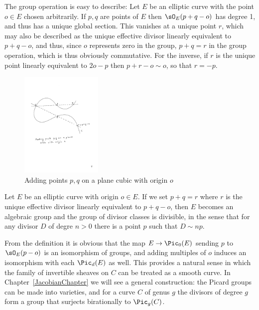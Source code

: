 The group operation is easy to describe:
Let $E$ be an elliptic curve with the point $o\in E$ chosen arbitrarily. If $p,q$ are points of $E$ then $\sO_E(p+q-o)$ has degree 1, and
thus has a unique global section. This vanishes at a unique point $r$, which may also be described as the unique
effective divisor linearly equivalent to $p+q-o$, and thus, since $o$ represents zero in the group,
$p+q = r$ in the group operation, which is thus obviously commutative. For the inverse, if $r$ is the  unique point
linearly equivalent to $2o-p$ then $p+r-o\sim o$, so that $r=-p$. 

\begin{figure}
 \caption{Adding points $p, q$ on a plane cubic with origin $o$}
\centerline {\includegraphics[height=2in]{"Fig3.1.pdf"}}
\end{figure}

\begin{proposition}\label{group law} Let $E$ be an elliptic curve with origin $o\in E$.
If we set $p+q = r$ where $r$ is the unique effective divisor linearly equivalent to $p+q-o$, then $E$ becomes an algebraic group
and the group of divisor classes is divisible, in the sense that for any divisor $D$ of degre $n>0$
 there is a point $p$ such that $D\sim np$.
 \end{proposition}

\begin{remark}
From the definition it is obvious that 
the map
$E \to \Pic_0(E)$ sending $p$ to $\sO_E(p-o)$ is an isomorphism of groups, and adding multiples of $o$
induces an isomorphism with each $\Pic_d(E)$ as well. This provides a natural sense
in which the family of invertible sheaves on $C$ can be treated as a smooth curve.
 In Chapter~\ref{JacobianChapter} we will see a general construction: the Picard groups can be made into
varieties, and for a curve $C$ of genus $g$ the divisors
of degree $g$ form a group that surjects birationally to $\Pic_g(C)$. 
\end{remark}

